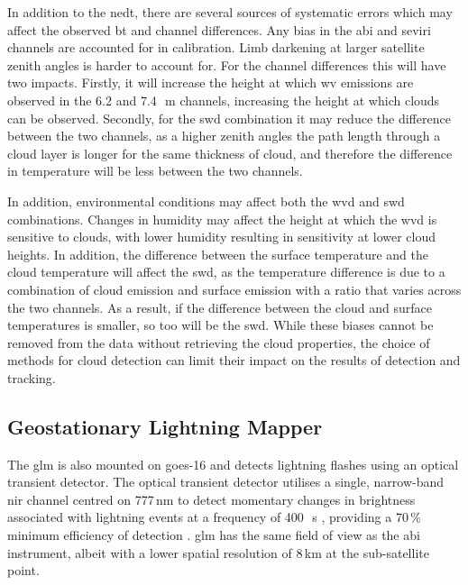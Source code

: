 In addition to the \acrshort{nedt}, there are several sources of systematic errors which may affect the observed \acrshort{bt} and channel differences.
Any bias in the \acrshort{abi} and \acrshort{seviri} channels are accounted for in calibration.
Limb darkening at larger satellite zenith angles is harder to account for.
For the channel differences this will have two impacts.
Firstly, it will increase the height at which \acrshort{wv} emissions are observed in the 6.2 and 7.4\,\unit{\mu m} channels, increasing the height at which clouds can be observed.
Secondly, for the \acrshort{swd} combination it may reduce the difference between the two channels, as a higher zenith angles the path length through a cloud layer is longer for the same thickness of cloud, and therefore the difference in temperature will be less between the two channels.

In addition, environmental conditions may affect both the \acrshort{wvd} and \acrshort{swd} combinations.
Changes in humidity may affect the height at which the \acrshort{wvd} is sensitive to clouds, with lower humidity resulting in sensitivity at lower cloud heights.
In addition, the difference between the surface temperature and the cloud temperature will affect the \acrshort{swd}, as the temperature difference is due to a combination of cloud emission and surface emission with a ratio that varies across the two channels.
As a result, if the difference between the cloud and surface temperatures is smaller, so too will be the \acrshort{swd}.
While these biases cannot be removed from the data without retrieving the cloud properties, the choice of methods for cloud detection can limit their impact on the results of detection and tracking.


\subsection{Geostationary Lightning Mapper}

The \acrshort{glm} is also mounted on \acrshort{goes}-16 and detects lightning flashes using an optical transient detector.
The optical transient detector utilises a single, narrow-band \acrshort{nir} channel centred on 777\,\unit{nm} \citep{orville_absolute_1984} to detect momentary changes in brightness associated with lightning events at a frequency of 400\,\unit{\mu s} \citep{christian_global_2003}, providing a 70\,\% minimum efficiency of detection \citep{goodman_goes-r_2013}.
\acrshort{glm} has the same field of view as the \acrshort{abi} instrument, albeit with a lower spatial resolution of 8\,\unit{km} at the sub-satellite point.

